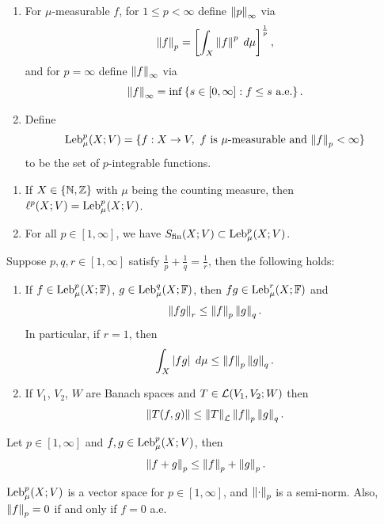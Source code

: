 \documentclass[a4paper]{article}
\begin{document}
\begin{defi}
\begin{enumerate}
\item For $\mu$-measurable $f$, for $1 \leq p < \infty$
define $\left\lVert p\right\rVert_\infty$ via
\[
\left\lVert f\right\rVert_p = \left[ \int_X \left\lVert f\right\rVert^p \; d \mu \right]^{\frac{1}{p}},
\]
and for $p = \infty$ define $\left\lVert f\right\rVert_\infty$ via
\[
\left\lVert f\right\rVert_\infty = \inf \left\{ s \in [0, \infty] : f
\leq s \text{ a.e.} \right\}.
\]

\item Define
\[
\operatorname{Leb}_\mu^p (X; V) = \{ f : X \to V, \text{ $f$ is $\mu$-measurable
and $\left\lVert f\right\rVert_p < \infty$} \}
\]
to be the set of $p$-integrable functions.
\end{enumerate}
\end{defi}

\begin{eg}
\begin{enumerate}
\item If $X \in \{\mathbb{N}, \mathbb{Z}\}$ with $\mu$ being the counting
measure, then $\ell^p(X; V) = \operatorname{Leb}_\mu^p (X; V)$.

\item For all $p \in [1, \infty]$, we have
$S_{\text{fin}}(X; V) \subset \operatorname{Leb}_\mu^p (X; V)$.
\end{enumerate}
\end{eg}

\begin{thm}
Suppose $p, q, r \in [1, \infty]$ satisfy $\frac{1}{p} + \frac{1}{q}
= \frac{1}{r}$, then the following holds:
\begin{enumerate}
\item If $f \in \operatorname{Leb}_\mu^p(X; \mathbb{F})$, $g \in \operatorname{Leb}_\mu^q (X; \mathbb{F})$,
then $f g \in \operatorname{Leb}_\mu^r (X; \mathbb{F})$ and
\[
\left\lVert f g\right\rVert_r \leq \left\lVert f\right\rVert_p \left\lVert g\right\rVert_q.
\]
In particular, if $r = 1$, then
\[
\int_X \left\lvert f g\right\rvert \; d \mu \leq \left\lVert f\right\rVert_p \left\lVert g\right\rVert_q.
\]

\item If $V_1$, $V_2$, $W$ are Banach spaces and
$T \in \mathcal{L}(V_1, V_2 ; W)$ then
\[
\left\lVert T (f, g)\right\rVert \leq \left\lVert T\right\rVert_{\mathcal{L}} \left\lVert f\right\rVert_p \left\lVert g\right\rVert_q.
\]
\end{enumerate}
\end{thm}


\begin{thm}
Let $p \in [1, \infty]$ and $f, g \in \operatorname{Leb}_\mu^p(X ; V)$, then
\[
\left\lVert f + g\right\rVert_p \leq \left\lVert f\right\rVert_p + \left\lVert g\right\rVert_p.
\]
\end{thm}

\begin{cor}
$\operatorname{Leb}_\mu^p(X; V)$ is a vector space for $p \in [1, \infty]$,
and $\left\lVert \cdot\right\rVert_p$ is a semi-norm. Also,
$\left\lVert f\right\rVert_p = 0$ if and only if $f = 0$ a.e.
\end{cor}
\end{document}
